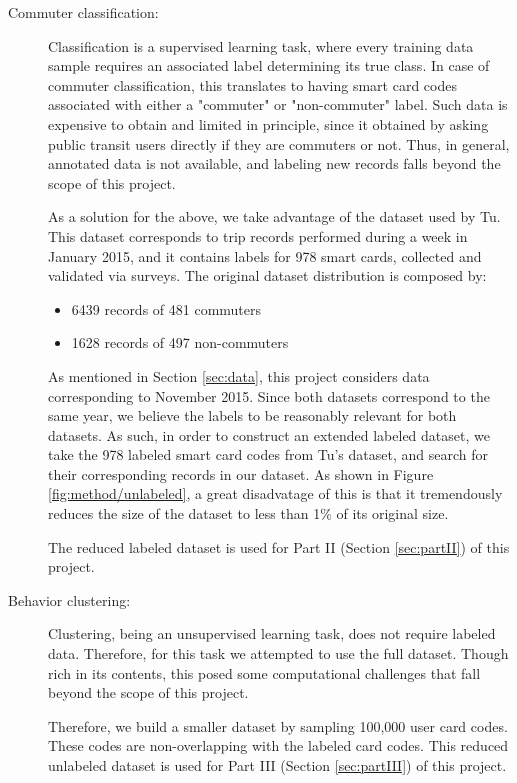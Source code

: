 \documentclass{article}
\begin{document}
\begin{description}%
\item[Commuter classification:]
Classification is a supervised learning task, where every training data sample requires an associated label determining its true class. In case of commuter classification, this translates to having smart card codes associated with either a "commuter" or "non-commuter" label. Such data is expensive to obtain and limited in principle, since it obtained by asking public transit users directly if they are commuters or not. Thus, in general, annotated data is not available, and labeling new records falls beyond the scope of this project. 

As a solution for the above, we take advantage of the dataset used by Tu\cite{tu2016impact}. This dataset corresponds to trip records performed during a week in January 2015, and it contains labels for 978 smart cards, collected and validated via surveys. The original dataset distribution is composed by:

\begin{itemize}
\item 6439 records of 481 commuters
\item 1628 records of 497 non-commuters
\end{itemize}

As mentioned in Section \ref{sec:data}, this project considers data corresponding to November 2015. Since both datasets correspond to the same year, we believe the labels to be reasonably relevant for both datasets. As such, in order to construct an extended labeled dataset, we take the 978 labeled smart card codes from Tu's dataset, and search for their corresponding records in our dataset. As shown in Figure \ref{fig:method/unlabeled}, a great disadvatage of this is that it tremendously reduces the size of the dataset to less than 1\% of its original size. 

The reduced labeled dataset is used for Part II (Section \ref{sec:partII}) of this project. 

\item[Behavior clustering:] 
Clustering, being an unsupervised learning task, does not require labeled data. Therefore, for this task we attempted to use the full dataset. Though rich in its contents, this posed some computational challenges that fall beyond the scope of this project. 

Therefore, we build a smaller dataset by sampling 100,000 user card codes. These codes are non-overlapping with the labeled card codes. This reduced unlabeled dataset is used for Part III (Section \ref{sec:partIII}) of this project.
\end{description}
\end{document}
